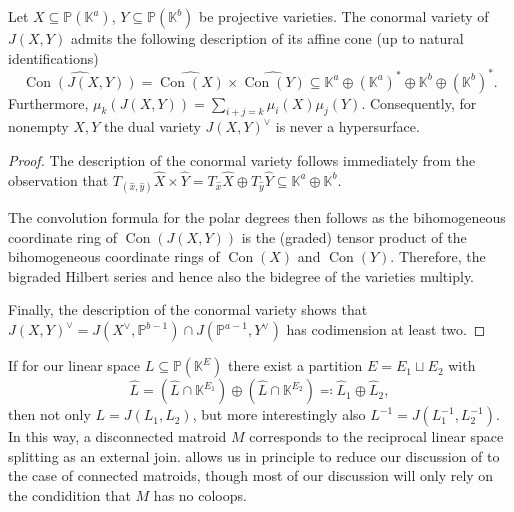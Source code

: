 \documentclass[12pt,a4paper,english]{scrartcl}
\newcommand{\KK}{\mathbb{K}}
\newcommand{\PP}{\mathbb{P}}
\DeclareMathOperator{\Con}{Con}
\begin{document}
\begin{lemma}\label{lem:convolution_of_polardegs}
Let $X \subseteq \PP(\KK^a)$, $Y \subseteq \PP(\KK^b)$ be projective varieties. The conormal variety of $J(X,Y)$ admits the following description of its affine cone (up to natural identifications)
\[
\widehat{\Con(J(X,Y))} = \widehat{\Con(X)} \times \widehat{\Con(Y)} \subseteq \KK^a \oplus (\KK^a)^* \oplus \KK^b \oplus (\KK^b)^*.
\]
Furthermore, $\mu_k(J(X,Y)) = \sum_{i+j=k} \mu_i(X)\mu_j(Y)$. Consequently, for nonempty $X,Y$ the dual variety $J(X,Y)^\vee$ is never a hypersurface.
\end{lemma}
\begin{proof}
The description of the conormal variety follows immediately from the observation that $T_{(\hat x,\hat y)}\widehat{X}\times \widehat{Y} = T_{\hat x} \widehat{X} \oplus T_{\hat y}\widehat{Y} \subseteq \KK^a \oplus \KK^b$.

The convolution formula for the polar degrees then follows as the bihomogeneous coordinate ring of $\Con(J(X,Y))$ is the (graded) tensor product of the bihomogeneous coordinate rings of $\Con(X)$ and $\Con(Y)$. Therefore, the bigraded Hilbert series and hence also the bidegree of the varieties multiply.

Finally, the description of the conormal variety shows that $ J(X,Y)^\vee = J(X^\vee,\PP^{b-1}) \cap J(\PP^{a-1},Y^\vee)$ has codimension at least two.
\end{proof}

\begin{example}
If for our linear space $L \subseteq \PP(\KK^E)$ there exist a partition $E = E_1 \sqcup E_2$ with
\[
\widehat{L} = (\widehat{L} \cap \KK^{E_1}) \oplus (\widehat{L} \cap \KK^{E_2}) \eqcolon \widehat{L}_1 \oplus \widehat{L}_2,
\]
then not only $L = J(L_1,L_2)$, but more interestingly also $L^{-1} = J(L_1^{-1},L_2^{-1})$. In this way, a disconnected matroid $M$ corresponds to the reciprocal linear space splitting as an external join.  allows us in principle to reduce our discussion of  to the case of connected matroids, though most of our discussion will only rely on the condidition that $M$ has no coloops.
\end{example}


\end{document}
